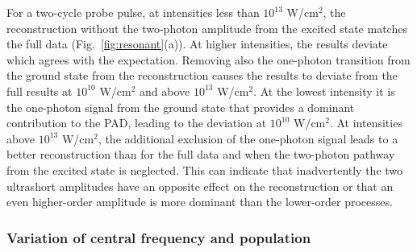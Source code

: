 For a two-cycle probe pulse, at intensities less than $10^{13}$ W/cm$^2$, the reconstruction without the two-photon amplitude from the excited state matches the full data (Fig.~\ref{fig:resonant}(a)). At higher intensities, the  results deviate which agrees with the expectation.  Removing also the one-photon transition from the ground state from the reconstruction causes the results to deviate from the full results at $10^{10}$ W/cm$^2$ and above $10^{13}$ W/cm$^2$. At the lowest intensity it is the one-photon signal from the ground state that provides a dominant contribution to the PAD, leading to the deviation at $10^{10}$ W/cm$^2$. At intensities above $10^{13}$ W/cm$^2$, the additional exclusion of the one-photon signal leads to a better reconstruction than for the full data and when the two-photon pathway from the excited state is neglected. This can indicate that inadvertently the two ultrashort amplitudes have an opposite effect on the reconstruction or that an even higher-order amplitude is more dominant than the lower-order processes.


\subsubsection{Variation of central frequency and population }

